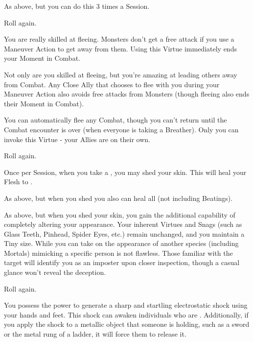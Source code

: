 \begin{multicols*}{2}
 As above, but you can do this 3 times a Session.

 Roll again. 


\NC[Name=Run Away!]

 You are really skilled at fleeing. Monsters don't get a free attack if you use a Maneuver Action to get away from them.  Using this Virtue immediately ends your Moment in Combat.

 Not only are you skilled at fleeing, but you're amazing at leading others away from Combat. Any Close Ally that chooses to flee with you during your Maneuver Action also avoids free attacks from Monsters (though fleeing also ends their Moment in Combat).

 You can automatically flee any Combat, though you can't return until the Combat encounter is over (when everyone is taking a Breather). Only you can invoke this Virtue - your Allies are on their own.

 Roll again.

\NC[Name=Shedding]

 Once per Session, when you take a , you may shed your skin.  This will heal your Flesh to \MAX.

 As above, but when you shed you also can heal all  (not including Beatings).

 As above, but when you shed your skin, you gain the additional capability of completely altering your appearance. Your inherent Virtues and Snags (such as Glass Teeth, Pinhead, Spider Eyes, etc.) remain unchanged, and you maintain a Tiny size. While you can take on the appearance of another species (including Mortals) mimicking a specific person is not flawless. Those familiar with the target will identify you as an imposter upon closer inspection, though a casual glance won't reveal the deception.

 Roll again.

\NC[Name=Shocky]

 You possess the power to generate a sharp and startling electrostatic shock using your hands and feet. This shock can awaken individuals who are . Additionally, if you apply the shock to a metallic object that someone is holding, such as a sword or the metal rung of a ladder, it will force them to release it.


\end{multicols*}

